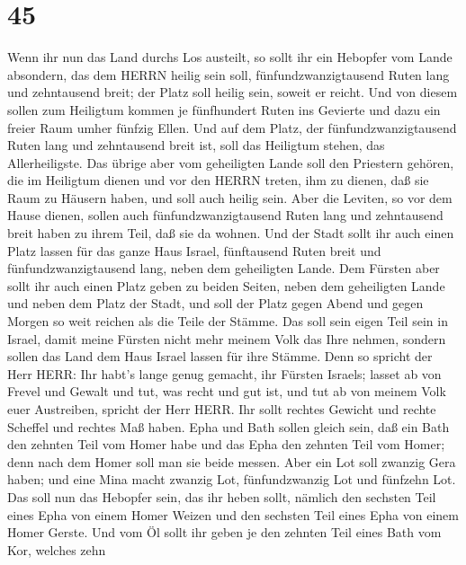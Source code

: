 \hypertarget{section-44}{%
\section{45}\label{section-44}}

 Wenn ihr nun das Land durchs Los austeilt, so sollt ihr ein
Hebopfer vom Lande absondern, das dem HERRN heilig sein soll,
fünfundzwanzigtausend Ruten lang und zehntausend breit; der Platz soll
heilig sein, soweit er reicht.  Und von diesem sollen zum
Heiligtum kommen je fünfhundert Ruten ins Gevierte und dazu ein freier
Raum umher fünfzig Ellen.  Und auf dem Platz, der
fünfundzwanzigtausend Ruten lang und zehntausend breit ist, soll das
Heiligtum stehen, das Allerheiligste.  Das übrige aber vom
geheiligten Lande soll den Priestern gehören, die im Heiligtum dienen
und vor den HERRN treten, ihm zu dienen, daß sie Raum zu Häusern haben,
und soll auch heilig sein.  Aber die Leviten, so vor dem
Hause dienen, sollen auch fünfundzwanzigtausend Ruten lang und
zehntausend breit haben zu ihrem Teil, daß sie da wohnen. 
Und der Stadt sollt ihr auch einen Platz lassen für das ganze Haus
Israel, fünftausend Ruten breit und fünfundzwanzigtausend lang, neben
dem geheiligten Lande.  Dem Fürsten aber sollt ihr auch
einen Platz geben zu beiden Seiten, neben dem geheiligten Lande und
neben dem Platz der Stadt, und soll der Platz gegen Abend und gegen
Morgen so weit reichen als die Teile der Stämme.  Das soll
sein eigen Teil sein in Israel, damit meine Fürsten nicht mehr meinem
Volk das Ihre nehmen, sondern sollen das Land dem Haus Israel lassen für
ihre Stämme.  Denn so spricht der Herr HERR: Ihr habt's
lange genug gemacht, ihr Fürsten Israels; lasset ab von Frevel und
Gewalt und tut, was recht und gut ist, und tut ab von meinem Volk euer
Austreiben, spricht der Herr HERR.  Ihr sollt rechtes
Gewicht und rechte Scheffel und rechtes Maß haben.  Epha
und Bath sollen gleich sein, daß ein Bath den zehnten Teil vom Homer
habe und das Epha den zehnten Teil vom Homer; denn nach dem Homer soll
man sie beide messen.  Aber ein Lot soll zwanzig Gera
haben; und eine Mina macht zwanzig Lot, fünfundzwanzig Lot und fünfzehn
Lot.  Das soll nun das Hebopfer sein, das ihr heben sollt,
nämlich den sechsten Teil eines Epha von einem Homer Weizen und den
sechsten Teil eines Epha von einem Homer Gerste.  Und vom
Öl sollt ihr geben je den zehnten Teil eines Bath vom Kor, welches zehn
